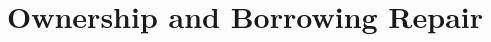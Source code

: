 \section{Ownership and Borrowing Repair \cite{AdventureOfALifetime}}
\label{app:ownership_and_borrowing_repair}


